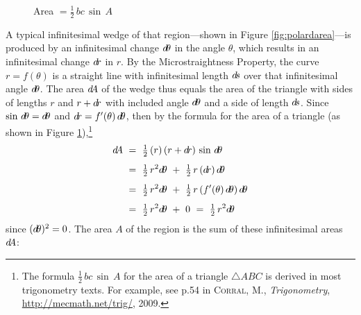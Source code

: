 \begin{figure}[h]
\begin{minipage}[b]{5cm}
\begin{center}
\begin{tikzpicture}[>=latex,every node/.style={font=\small}]
\end{tikzpicture}\vspace{-4mm}
\end{center}
\caption[]{\enskip Area $\dA$}
\label{fig:polardarea}
\end{minipage}
\begin{minipage}[b]{5cm}
\begin{center}
\vspace{-4mm}
\end{center}
\caption[]{\enskip Area $= \tfrac{1}{2}\,bc\,\sin\,A$}
\label{fig:areatriangle}
\end{minipage}
\end{figure}

A typical infinitesimal wedge of that region---shown in Figure
\ref{fig:polardarea}---is produced by an infinitesimal change $d\!\theta$ in the
angle $\theta$, which results in an infinitesimal change $d\!r$ in $r$. By the
Microstraightness Property, the curve $r=f(\theta)$ is a straight line with
infinitesimal length $d\!s$ over that infinitesimal angle $d\!\theta$.
The area $\dA$ of the wedge thus equals the area of the triangle with sides
of lengths $r$ and $r+d\!r$ with included angle $d\!\theta$ and a side of length
$d\!s$. Since $\sin\,d\!\theta = d\!\theta$ and $d\!r=f'(\theta)\,d\!\theta$, then by
the formula for the area of a triangle (as shown in Figure
\ref{fig:areatriangle}),\footnote{The formula $\tfrac{1}{2}\,bc\,\sin\,A$ for
the area of a triangle $\triangle ABC$ is derived in most trigonometry texts.
For example, see p.54 in \textsc{Corral, M.}, \emph{Trigonometry},
\url{http://mecmath.net/trig/}, 2009.}
\begin{align*}
\dA ~&=~ \tfrac{1}{2}\,(r)\,(r+\dr)\,\sin\,\dtheta\\[4pt]
&=~ \tfrac{1}{2}\,r^2 \dtheta ~+~ \tfrac{1}{2}\,r\,(\dr)\,\dtheta\\[4pt]
&=~ \tfrac{1}{2}\,r^2 \dtheta ~+~ \tfrac{1}{2}\,r\,(f'(\theta)\,\dtheta)\,\dtheta\\[4pt]
&=~ \tfrac{1}{2}\,r^2 \dtheta ~+~ 0 ~=~ \tfrac{1}{2}\,r^2 \dtheta
\end{align*}
since $(d\!\theta)^2=0$. The area $A$ of the region is the sum of these
infinitesimal areas $\dA$:

